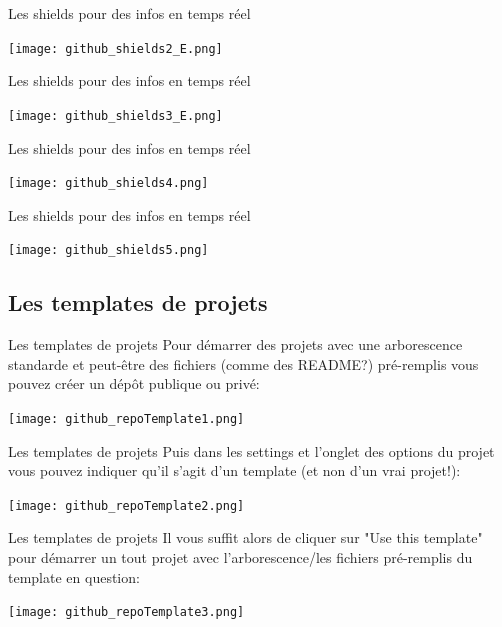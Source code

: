 \documentclass{beamer}
\begin{document}
\begin{frame}{Les shields pour des infos en temps réel}
\begin{center}
	\texttt{[image: github\_shields2\_E.png]}
\end{center}
\end{frame}

\begin{frame}{Les shields pour des infos en temps réel}
\begin{center}
	\texttt{[image: github\_shields3\_E.png]}
\end{center}
\end{frame}

\begin{frame}{Les shields pour des infos en temps réel}
\begin{center}
	\texttt{[image: github\_shields4.png]}
\end{center}
\end{frame}

\begin{frame}{Les shields pour des infos en temps réel}
\begin{center}
	\texttt{[image: github\_shields5.png]}
\end{center}
\end{frame}


\subsection{Les templates de projets}
\begin{frame}{Les templates de projets}
Pour démarrer des projets avec une arborescence standarde et peut-être des fichiers (comme des README?) pré-remplis vous pouvez créer un dépôt publique ou privé:
\begin{center}
	\texttt{[image: github\_repoTemplate1.png]}
\end{center}
\end{frame}

\begin{frame}{Les templates de projets}
Puis dans les settings et l'onglet des options du projet vous pouvez indiquer qu'il s'agit d'un template (et non d'un vrai projet!):
\begin{center}
	\texttt{[image: github\_repoTemplate2.png]}
\end{center}
\end{frame}

\begin{frame}{Les templates de projets}
Il vous suffit alors de cliquer sur "Use this template" pour démarrer un tout projet avec l'arborescence/les fichiers pré-remplis du template en question:
\begin{center}
	\texttt{[image: github\_repoTemplate3.png]}
\end{center}
\end{frame}
\end{document}
